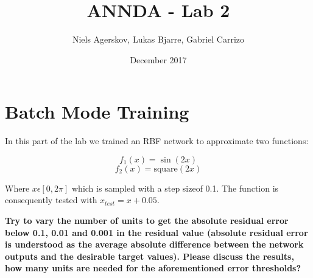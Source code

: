 \documentclass{article}
\title{ANNDA - Lab 2}
\author{Niels Agerskov, Lukas Bjarre, Gabriel Carrizo}
\date{December 2017}
\begin{document}
\maketitle
\pagebreak

\section{Batch Mode Training}

In this part of the lab we trained an RBF network to approximate two functions:

\begin{equation}
  f_1(x) = \sin(2x)
\end{equation}
\begin{equation}
  f_2(x) = \mathrm{square}(2x)
\end{equation}

Where $x \epsilon [0, 2\pi]$ which is sampled with a step sizeof 0.1. The function is consequently tested with $x_{test} = x+0.05$.

\textbf{Try to vary the number of units to get the absolute residual error below 0.1, 0.01 and 0.001 in the residual value (absolute residual error is understood as the average absolute difference between the network outputs and the desirable target values). Please discuss the results, how many units are needed for the aforementioned error thresholds?}
\end{document}
